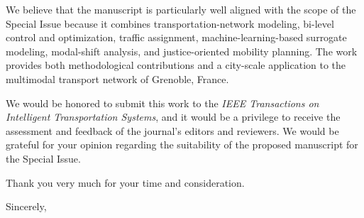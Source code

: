 \documentclass[11pt]{letter}
\begin{document}
\begin{letter}
We believe that the manuscript is particularly well aligned with the
scope of the Special Issue because it combines transportation-network
modeling, bi-level control and optimization, traffic assignment,
machine-learning-based surrogate modeling, modal-shift analysis, and
justice-oriented mobility planning. The work provides both methodological
contributions and a city-scale application to the multimodal transport
network of Grenoble, France.

We would be honored to submit this work to the
\emph{IEEE Transactions on Intelligent Transportation Systems}, and it
would be a privilege to receive the assessment and feedback of the
journal's editors and reviewers. We would be grateful for your opinion
regarding the suitability of the proposed manuscript for the Special
Issue.

Thank you very much for your time and consideration.

\closing{Sincerely,}
\vspace{-5cm} %
\noindent
\end{letter}
\end{document}
